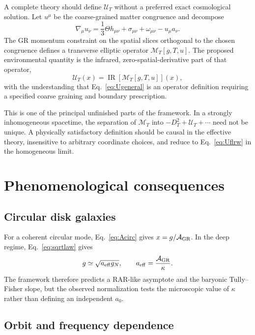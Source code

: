 \documentclass[11pt]{article}
\newcommand{\MT}{\mathcal{M}_{T}}
\newcommand{\UT}{\mathcal{U}_{T}}
\begin{document}
A complete theory should define $\UT$ without a preferred exact cosmological solution. Let $u^\mu$ be the coarse-grained matter congruence and decompose
\begin{equation}
    \nabla_\mu u_\nu
    =\frac13\Theta h_{\mu\nu}
    +\sigma_{\mu\nu}
    +\omega_{\mu\nu}
    -u_\mu a_\nu.
\end{equation}
The GR momentum constraint on the spatial slices orthogonal to the chosen congruence defines a transverse elliptic operator $\MT[g,T,u]$. The proposed environmental quantity is the infrared, zero-spatial-derivative part of that operator,
\begin{equation}
    \UT(x)=\operatorname{IR}[\MT[g,T,u]](x),
    \label{eq:Ugeneral}
\end{equation}
with the understanding that Eq.~\eqref{eq:Ugeneral} is an operator definition requiring a specified coarse graining and boundary prescription.

This is one of the principal unfinished parts of the framework. In a strongly inhomogeneous spacetime, the separation of $\MT$ into $-D_T^2+\UT+\cdots$ need not be unique. A physically satisfactory definition should be causal in the effective theory, insensitive to arbitrary coordinate choices, and reduce to Eq.~\eqref{eq:Uflrw} in the homogeneous limit.

\section{Phenomenological consequences}

\subsection{Circular disk galaxies}

For a coherent circular mode, Eq.~\eqref{eq:Acirc} gives $x=g/\mathcal A_{\rm GR}$. In the deep regime, Eq.~\eqref{eq:sqrtlaw} gives
\begin{equation}
    g\simeq\sqrt{a_{\rm eff}g_N},
    \qquad
    a_{\rm eff}=\frac{\mathcal A_{\rm GR}}{\kappa}.
\end{equation}
The framework therefore predicts a RAR-like asymptote and the baryonic Tully--Fisher slope, but the observed normalization tests the microscopic value of $\kappa$ rather than defining an independent $a_0$.

\subsection{Orbit and frequency dependence}
\end{document}
